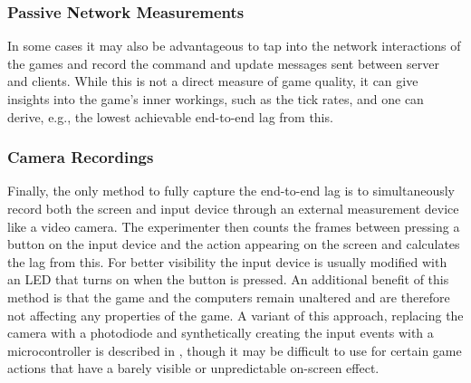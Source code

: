 \subsubsection{Passive Network Measurements}
In some cases it may also be advantageous to tap into the network interactions of the games and record the command and update messages sent between server and clients. While this is not a direct measure of game quality, it can give insights into the game's inner workings, such as the tick rates, and one can derive, e.g., the lowest achievable end-to-end lag from this.




\subsubsection{Camera Recordings}
Finally, the only method to fully capture the end-to-end lag is to simultaneously record both the screen and input device through an external measurement device like a video camera.
The experimenter then counts the frames between pressing a button on the input device and the action appearing on the screen and calculates the lag from this. For better visibility the input device is usually modified with an LED that turns on when the button is pressed.
An additional benefit of this method is that the game and the computers remain unaltered and are therefore not affecting any properties of the game. A variant of this approach, replacing the camera with a photodiode and synthetically creating the input events with a microcontroller is described in \cite{beyermethod}, though it may be difficult to use for certain game actions that have a barely visible or unpredictable on-screen effect.




